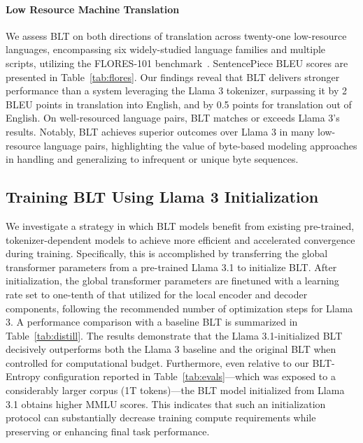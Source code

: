 \paragraph{Low Resource Machine Translation} We assess {\textsc BLT} on both directions of translation across twenty-one low-resource languages, encompassing six widely-studied language families and multiple scripts, utilizing the FLORES-101 benchmark~\citep{goyal2022flores}. SentencePiece BLEU scores are presented in Table~\ref{tab:flores}. Our findings reveal that {\textsc BLT} delivers stronger performance than a system leveraging the Llama 3 tokenizer, surpassing it by 2 BLEU points in translation into English, and by 0.5 points for translation out of English. On well-resourced language pairs, {\textsc BLT} matches or exceeds Llama 3’s results. Notably, {\textsc BLT} achieves superior outcomes over Llama 3 in many low-resource language pairs, highlighting the value of byte-based modeling approaches in handling and generalizing to infrequent or unique byte sequences.

\subsection{Training {\textsc BLT} Using Llama 3 Initialization}
\label{sec:distillation}
We investigate a strategy in which {\textsc BLT} models benefit from existing pre-trained, tokenizer-dependent models to achieve more efficient and accelerated convergence during training. Specifically, this is accomplished by transferring the global transformer parameters from a pre-trained Llama 3.1 to initialize {\textsc BLT}. After initialization, the global transformer parameters are finetuned with a learning rate set to one-tenth of that utilized for the local encoder and decoder components, following the recommended number of optimization steps for Llama 3. A performance comparison with a baseline {\textsc BLT} is summarized in Table~\ref{tab:distill}. The results demonstrate that the Llama 3.1-initialized {\textsc BLT} decisively outperforms both the Llama 3 baseline and the original {\textsc BLT} when controlled for computational budget. Furthermore, even relative to our {\textsc BLT}-Entropy configuration reported in Table~\ref{tab:evals}—which was exposed to a considerably larger corpus (1T tokens)—the {\textsc BLT} model initialized from Llama 3.1 obtains higher MMLU scores. This indicates that such an initialization protocol can substantially decrease training compute requirements while preserving or enhancing final task performance.


